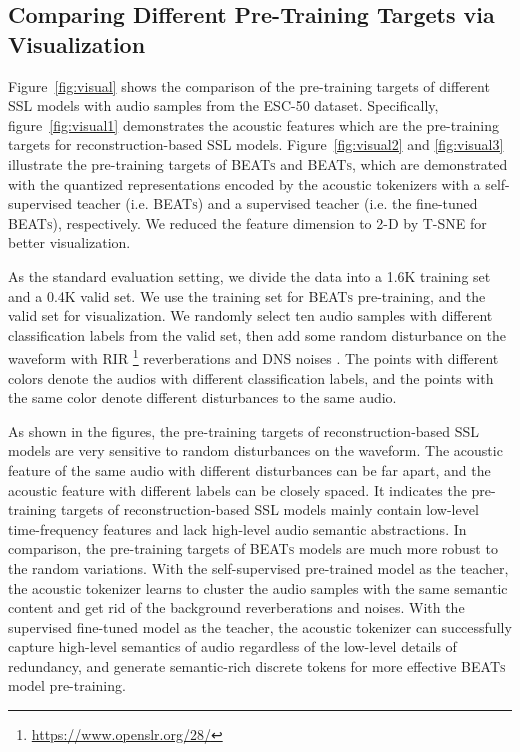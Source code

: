 \documentclass{article}
\theoremstyle{plain}
\theoremstyle{definition}
\theoremstyle{remark}
\newcommand\our{\textsc{BEATs}}
\begin{document}
\subsection{Comparing Different Pre-Training Targets via Visualization}

Figure~\ref{fig:visual} shows the comparison of the pre-training targets of different SSL models with audio samples from the ESC-50 dataset.
Specifically, figure~\ref{fig:visual1} demonstrates the acoustic features which are the pre-training targets for reconstruction-based SSL models. Figure~\ref{fig:visual2} and \ref{fig:visual3} illustrate the pre-training targets of \our{} and \our{}, which are demonstrated with the quantized representations encoded by the acoustic tokenizers with a self-supervised teacher (i.e. \our{}) and a supervised teacher (i.e. the fine-tuned \our{}), respectively.
We reduced the feature dimension to 2-D by T-SNE \citep{van2008visualizing} for better visualization.

As the standard evaluation setting, we divide the data into a 1.6K training set and a 0.4K valid set.
We use the training set for \our{} pre-training, and the valid set for visualization.
We randomly select ten audio samples with different classification labels from the valid set, then add some random disturbance on the waveform with RIR \footnote{\url{https://www.openslr.org/28/}} reverberations and DNS noises \citep{reddy2021interspeech}.
The points with different colors denote the audios with different classification labels, and the points with the same color denote different disturbances to the same audio.

As shown in the figures, the pre-training targets of reconstruction-based SSL models are very sensitive to random disturbances on the waveform. 
The acoustic feature of the same audio with different disturbances can be far apart, and the acoustic feature with different labels can be closely spaced.
It indicates the pre-training targets of reconstruction-based SSL models mainly contain low-level time-frequency features and lack high-level audio semantic abstractions.
In comparison, the pre-training targets of \our{} models are much more robust to the random variations. With the self-supervised pre-trained model as the teacher, the acoustic tokenizer learns to cluster the audio samples with the same semantic content and get rid of the background reverberations and noises. With the supervised fine-tuned model as the teacher, the acoustic tokenizer can successfully 
capture high-level semantics of audio regardless of the low-level details of redundancy, and generate semantic-rich discrete tokens for more effective \our{} model pre-training.
\end{document}

